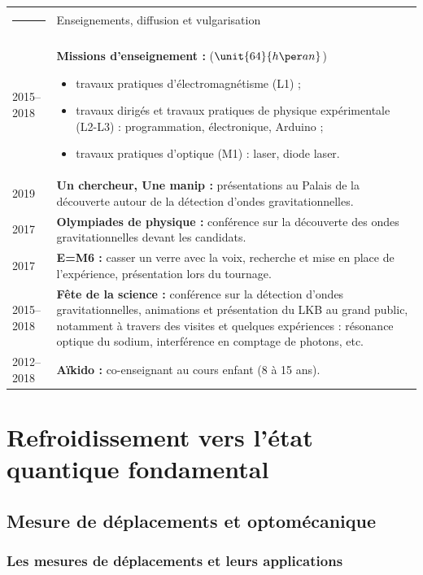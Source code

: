 \documentclass[12pt,a4paper]{article}
\begin{document}
\begin{tabular*}{\textwidth}{p{}<{\raggedleft}p{}}
\textcolor{theme}{\rule{0.12\textwidth}{2.5mm}} &
\large\textcolor{theme}{Enseignements, diffusion et vulgarisation} \vspace{3pt} \\
2015--2018 & \textbf{Missions d'enseignement :} ($\unit{64}{h\per an}$)
\begin{itemize}
\item travaux pratiques d'électromagnétisme (L1) ;
\item travaux dirigés et travaux pratiques de physique expérimentale (L2-L3) : programmation, électronique, Arduino ;
\item travaux pratiques d'optique (M1) : laser, diode laser.
\end{itemize}\\
\vspace{-8mm} 2019 &
\vspace{-8mm} \textbf{Un chercheur, Une manip :} présentations au Palais de la découverte autour de la détection d'ondes gravitationnelles.\\
2017 &
\textbf{Olympiades de physique :} conférence sur la découverte des ondes gravitationnelles devant les candidats.\\
2017 &
\textbf{E=M6 :} casser un verre avec la voix, recherche et mise en place de l'expérience, présentation lors du tournage.\\
2015--2018 &
\textbf{Fête de la science :} conférence sur la détection d'ondes gravitationnelles, animations et présentation du LKB au grand public, notamment à travers des visites et quelques expériences : résonance optique du sodium, interférence en comptage de photons, etc.\\
2012--2018 &
\textbf{Aïkido :} co-enseignant au cours enfant (8 à 15 ans). 
\end{tabular*}

\section{Refroidissement vers l'état quantique fondamental}

\subsection{Mesure de déplacements et optomécanique}
\label{sec:intro}

\subsubsection{Les mesures de déplacements et leurs applications}
\end{document}
